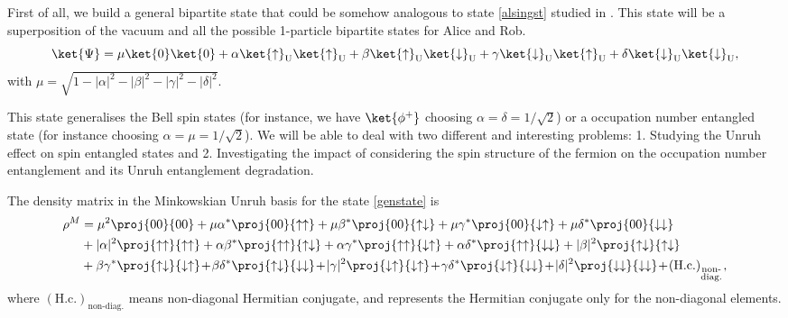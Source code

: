 First of all, we build a general bipartite state that could be somehow analogous to state \eqref{alsingst} studied in \cite{AlsingSchul}. This state will be a superposition of the vacuum and all the possible 1-particle bipartite states for Alice and Rob.
\begin{equation}\label{genstate}
\ket{\Psi}=\mu\ket{0}\ket{0}+\alpha\ket{\uparrow}_\text{U}\ket{\uparrow}_\text{U}+\beta\ket{\uparrow}_\text{U}\ket{\downarrow}_\text{U}+ \gamma\ket{\downarrow}_\text{U}\ket{\uparrow}_\text{U}+\delta\ket{\downarrow}_\text{U}\ket{\downarrow}_\text{U},
\end{equation}
with $\mu=\sqrt{1-|\alpha|^2-|\beta|^2-|\gamma|^2-|\delta|^2}$.

This state generalises the Bell spin states (for instance, we have $\ket{\phi^+}$ choosing $\alpha=\delta=1/\sqrt2$) or a occupation number entangled state (for instance choosing $\alpha=\mu=1/\sqrt2$).  We will be able to deal with two different and interesting problems: 1. Studying the Unruh effect on  spin entangled states and 2. Investigating the impact of considering the spin structure of the fermion on the occupation number entanglement and its Unruh entanglement degradation.

The density matrix in the Minkowskian Unruh basis for the state \eqref{genstate} is
\begin{align}\label{Minkowdens}
\nonumber\rho^M&=\mu^2\proj{00}{00}+\mu\alpha^*\proj{00}{\uparrow\uparrow}+\mu\beta^*\proj{00}{\uparrow\downarrow}+\mu\gamma^*\proj{00}{\downarrow\uparrow}+\mu\delta^*\proj{00}{\downarrow\downarrow}\\*
\nonumber &+|\alpha|^2\proj{\uparrow\uparrow}{\uparrow\uparrow}+\alpha\beta^*\proj{\uparrow\uparrow}{\uparrow\downarrow}+\alpha\gamma^*\proj{\uparrow\uparrow}{\downarrow\uparrow}+\alpha\delta^*\proj{\uparrow\uparrow}{\downarrow\downarrow}+|\beta|^2\proj{\uparrow\downarrow}{\uparrow\downarrow}\\*
&+\beta\gamma^*\proj{\uparrow\downarrow}{\downarrow\uparrow}\!+\!\beta\delta^*\proj{\uparrow\downarrow}{\downarrow\downarrow}\!+\!|\gamma|^2\proj{\downarrow\uparrow}{\downarrow\uparrow}\!+\!\gamma\delta^*\proj{\downarrow\uparrow}{\downarrow\downarrow}\!+\!|\delta|^2\proj{\downarrow\downarrow}{\downarrow\downarrow}\!+\! (\text{H.c.})_{_{\substack{\text{non-}\\\text{diag.}}}},
\end{align}
where $(\text{H.c.})_{\text{non-diag.}}$ means non-diagonal Hermitian conjugate, and represents the Hermitian conjugate only for the non-diagonal elements.

